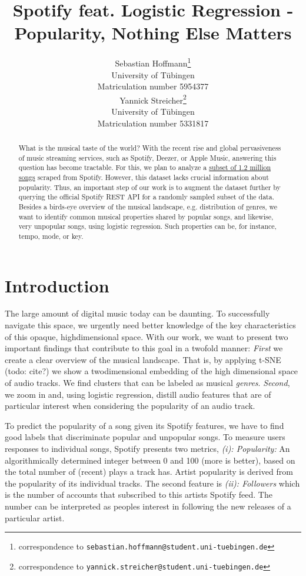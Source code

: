 \documentclass{article}
\title{Spotify feat. Logistic Regression - \\ Popularity, Nothing Else Matters}
\author{%
  Sebastian Hoffmann\thanks{correspondence to \texttt{sebastian.hoffmann@student.uni-tuebingen.de}}\\
  University of Tübingen\\
  Matriculation number 5954377\\
  \And
  Yannick Streicher\thanks{correspondence to \texttt{yannick.streicher@student.uni-tuebingen.de}}\\
  University of Tübingen\\
  Matriculation number 5331817\\
}
\newcommand{\todo}[1]{{\color{red}todo: #1}}
\begin{document}
\maketitle

\begin{abstract}
  What is the musical taste of the world? With the recent rise and global pervasiveness of music streaming services, such as Spotify, Deezer, or Apple Music, answering this question has become tractable. For this, we plan to analyze a \href{https://www.kaggle.com/rodolfofigueroa/spotify-12m-songs}{subset of 1.2 million songs} scraped from Spotify. However, this dataset lacks crucial information about popularity. Thus, an important step of our work is to augment the dataset further by querying the official Spotify REST API for a randomly sampled subset of the data. Besides a birds-eye overview of the musical landscape, e.g. distribution of genres, we want to identify common musical properties shared by popular songs, and likewise, very unpopular songs, using logistic regression. Such properties can be, for instance, tempo, mode, or key.
\end{abstract}

\section{Introduction}
The large amount of digital music today can be daunting. To successfully navigate this space, we urgently need better knowledge of the key characteristics of this opaque, highdimensional space. With our work, we want to present two important findings that contribute to this goal in a twofold manner: \textit{First} we create a clear overview of the musical landscape. That is, by applying t-SNE (\todo{cite?}) we show a twodimensional embedding of the high dimensional space of audio tracks. We find clusters that can be labeled as musical \textit{genres}. \textit{Second}, we zoom in and, using logistic regression, distill audio features that are of particular interest when considering the popularity of an audio track.

To predict the popularity of a song given its Spotify features, we have to find good labels that discriminate popular and unpopular songs.
To measure users responses to individual songs, Spotify presents two metrics, \textit{(i): Popularity:} An algorithmically determined integer between 0 and 100 (more is better), based on the total number of (recent) plays a track has. Artist popularity is derived from the popularity of its individual tracks. The second feature is \textit{(ii): Followers} which is the number of accounts that subscribed to this artists Spotify feed. The number can be interpreted as peoples interest in following the new releases of a particular artist.
\end{document}
